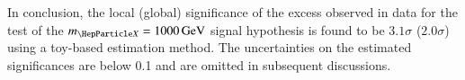 
In conclusion, the local (global) significance of the excess observed in data
for the test of the $\mX = \SI{1000}{\GeV}$ signal hypothesis is found to be
$3.1 \sigma$ ($2.0 \sigma$) using a toy-based estimation method. The
uncertainties on the estimated significances are below \num{0.1} and are omitted
in subsequent discussions.

